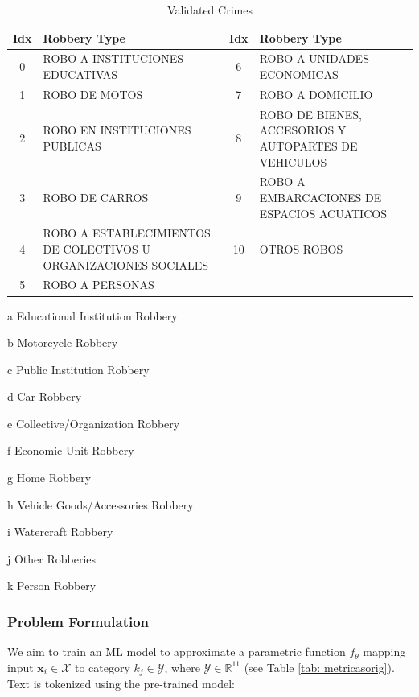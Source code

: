 \documentclass[onecolumn, journal, english, 12pt, a4paper]{IEEEtran} %
\theoremstyle{definition}
\begin{document}
\begin{table}[htbp]
    \centering
    \scriptsize
    \begin{threeparttable}
    \caption{Validated Crimes}
    \label{tab:listofRobberiesValidados}
    \begin{tabularx}{\linewidth}{|c|X|c|X|}
        \hline
        \textbf{Idx} & \textbf{Robbery Type} & \textbf{Idx} & \textbf{Robbery Type} \\
        \hline
        0 & ROBO A INSTITUCIONES EDUCATIVAS\tnote{a} & 6 & ROBO A UNIDADES ECONOMICAS\tnote{f} \\
        1 & ROBO DE MOTOS\tnote{b} & 7 & ROBO A DOMICILIO\tnote{g} \\
        2 & ROBO EN INSTITUCIONES PUBLICAS\tnote{c} & 8 & ROBO DE BIENES, ACCESORIOS Y AUTOPARTES DE VEHICULOS\tnote{h} \\
        3 & ROBO DE CARROS\tnote{d} & 9 & ROBO A EMBARCACIONES DE ESPACIOS ACUATICOS\tnote{i} \\
        4 & ROBO A ESTABLECIMIENTOS DE COLECTIVOS U ORGANIZACIONES SOCIALES\tnote{e} & 10 & OTROS ROBOS\tnote{j} \\
        5 & ROBO A PERSONAS\tnote{k} & & \\
        \hline
    \end{tabularx}
    \begin{tablenotes}[flushleft]
        \item[a] Educational Institution Robbery
        \item[b] Motorcycle Robbery
        \item[c] Public Institution Robbery
        \item[d] Car Robbery
        \item[e] Collective/Organization Robbery
        \item[f] Economic Unit Robbery
        \item[g] Home Robbery
        \item[h] Vehicle Goods/Accessories Robbery
        \item[i] Watercraft Robbery
        \item[j] Other Robberies
        \item[k] Person Robbery
    \end{tablenotes}
    \end{threeparttable}
\end{table}




\subsubsection{Problem Formulation}
We aim to train an ML model to approximate a parametric function
$f_\theta$ mapping input $\mathbf{x}_i \in \mathbf{\mathcal{X}}$ to
category $k_j \in \mathcal{Y}$, where
$\mathcal{Y} \in \mathbb{R}^{11}$ (see Table \ref{tab:
  metricasorig}). Text is tokenized using the pre-trained model:
\end{document}
